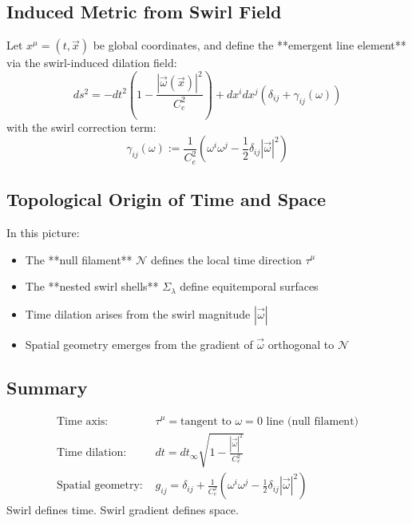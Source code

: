 \documentclass[12pt]{article}
\begin{document}
    \subsection{Induced Metric from Swirl Field}
    \label{subsec:induced_metric}

    Let \( x^\mu = (t, \vec{x}) \) be global coordinates, and define the **emergent line element** via the swirl-induced dilation field:
    \[
        ds^2 = -dt^2 \left( 1 - \frac{|\vec{\omega}(\vec{x})|^2}{C_e^2} \right) + dx^i dx^j \left( \delta_{ij} + \gamma_{ij}(\omega) \right)
    \]
    with the swirl correction term:
    \[
        \gamma_{ij}(\omega) := \frac{1}{C_e^2} \left( \omega^i \omega^j - \frac{1}{2} \delta_{ij} |\vec{\omega}|^2 \right)
    \]

    \subsection{Topological Origin of Time and Space}
    \label{subsec:topological_emergence}

    In this picture:
    \begin{itemize}[leftmargin=1.5em]
        \item The **null filament** \( \mathcal{N} \) defines the local time direction \( \tau^\mu \)
        \item The **nested swirl shells** \( \Sigma_\lambda \) define equitemporal surfaces
        \item Time dilation arises from the swirl magnitude \( |\vec{\omega}| \)
        \item Spatial geometry emerges from the gradient of \( \vec{\omega} \) orthogonal to \( \mathcal{N} \)
    \end{itemize}

    \subsection*{Summary}

    \begin{tcolorbox}[colback=purple!2, colframe=purple!60!black, title=Emergent Space-Time Structure]
        \begin{align*}
            \text{Time axis: } & \tau^\mu = \text{tangent to } \omega = 0 \text{ line (null filament)} \\
            \text{Time dilation: } & dt = dt_\infty \sqrt{1 - \frac{|\vec{\omega}|^2}{C_e^2}} \\
            \text{Spatial geometry: } & g_{ij} = \delta_{ij} + \frac{1}{C_e^2} \left( \omega^i \omega^j - \frac{1}{2} \delta_{ij} |\vec{\omega}|^2 \right)
        \end{align*}
        Swirl defines time. Swirl gradient defines space.
    \end{tcolorbox}
\end{document}
